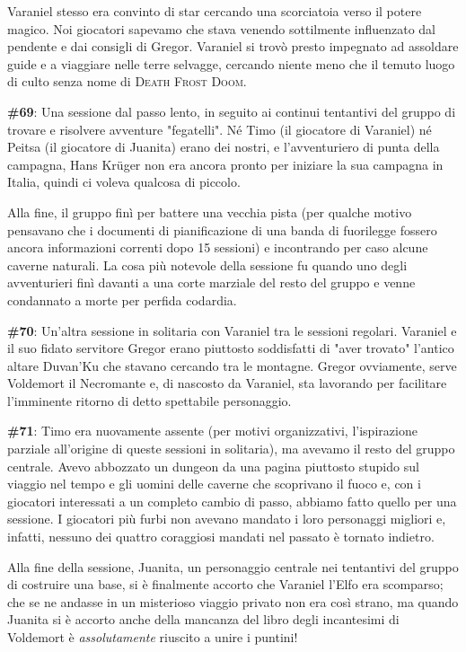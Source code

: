 Varaniel stesso era convinto di star cercando una scorciatoia verso il potere magico. Noi giocatori sapevamo che stava venendo sottilmente influenzato dal pendente e dai consigli di Gregor. Varaniel si trovò presto impegnato ad assoldare guide e a viaggiare nelle terre selvagge, cercando niente meno che il temuto luogo di culto senza nome di \textsc{Death Frost Doom}.

\textbf{\#69}: Una sessione dal passo lento, in seguito ai continui tentantivi del gruppo di trovare e risolvere avventure "fegatelli". Né Timo (il giocatore di Varaniel) né Peitsa (il giocatore di Juanita) erano dei nostri, e l'avventuriero di punta della campagna, Hans Krüger non era ancora pronto per iniziare la sua campagna in Italia, quindi ci voleva qualcosa di piccolo.

Alla fine, il gruppo finì per battere una vecchia pista (per qualche motivo pensavano che i documenti di pianificazione di una banda di fuorilegge fossero ancora informazioni correnti dopo 15 sessioni) e incontrando per caso alcune caverne naturali. La cosa più notevole della sessione fu quando uno degli avventurieri finì davanti a una corte marziale del resto del gruppo e venne condannato a morte per perfida codardia.

\textbf{\#70}: Un'altra sessione in solitaria con Varaniel tra le sessioni regolari. Varaniel e il suo fidato servitore Gregor erano piuttosto soddisfatti di "aver trovato" l'antico altare Duvan'Ku che stavano cercando tra le montagne. Gregor ovviamente, serve Voldemort il Necromante e, di nascosto da Varaniel, sta lavorando per facilitare l'imminente ritorno di detto spettabile personaggio.

\textbf{\#71}: Timo era nuovamente assente (per motivi organizzativi, l'ispirazione parziale all'origine di queste sessioni in solitaria), ma avevamo il resto del gruppo centrale. Avevo abbozzato un dungeon da una pagina piuttosto stupido sul viaggio nel tempo e gli uomini delle caverne che scoprivano il fuoco e, con i giocatori interessati a un completo cambio di passo, abbiamo fatto quello per una sessione. I giocatori più furbi non avevano mandato i loro personaggi migliori e, infatti, nessuno dei quattro coraggiosi mandati nel passato è tornato indietro.

Alla fine della sessione, Juanita, un personaggio centrale nei tentantivi del gruppo di costruire una base, si è finalmente accorto che Varaniel l'Elfo era scomparso; che se ne andasse in un misterioso viaggio privato non era così strano, ma quando Juanita si è accorto anche della mancanza del libro degli incantesimi di Voldemort è \textit{assolutamente} riuscito a unire i puntini!

